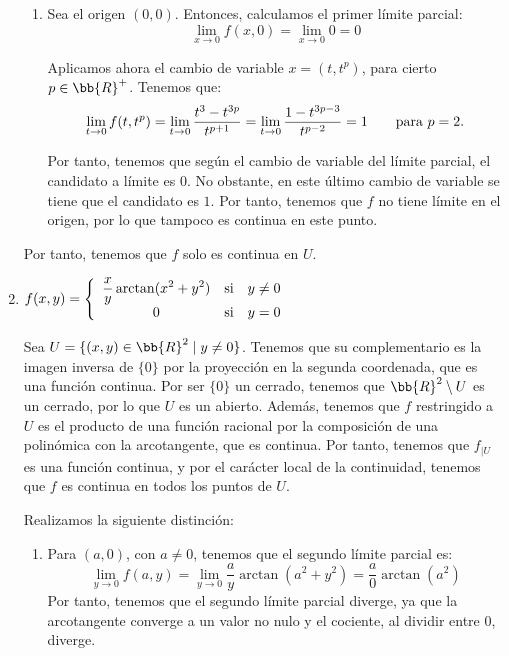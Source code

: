 \begin{ejercicio}
\begin{enumerate}
\begin{enumerate}
            \item Sea el origen $(0,0)$. Entonces, calculamos el primer límite parcial:
            \begin{equation*}
                \lim_{x\to 0}f(x,0)
                = \lim_{x\to 0} 0 = 0
            \end{equation*}

            Aplicamos ahora el cambio de variable $x=(t,t^p)$, para cierto $p\in \bb{R}^+$. Tenemos que:
            \begin{equation*}
                \lim_{t\to 0}f(t,t^p)
                = \lim_{t\to 0} \frac{t^3-t^{3p}}{t^{p+1}}
                = \lim_{t\to 0} \frac{1-t^{3p-3}}{t^{p-2}}
                = 1 \text{\qquad para $p=2$}.
            \end{equation*}
            
            Por tanto, tenemos que según el cambio de variable del límite parcial, el candidato a límite es $0$. No obstante, en este último cambio de variable se tiene que el candidato es $1$. Por tanto, tenemos que $f$ no tiene límite en el origen, por lo que tampoco es continua en este punto.
        \end{enumerate}

        Por tanto, tenemos que $f$ solo es continua en $U$.

        \item $\displaystyle
            f(x,y)=
            \left\{\begin{array}{ccc}
                \displaystyle \frac{x}{y}\arctan(x^2+y^2) &\text{si}& y\neq 0\\
                0 &\text{si}& y=0
            \end{array}\right. \displaystyle$

        Sea $U=\{(x,y)\in \bb{R}^2\mid y\neq 0\}$. Tenemos que su complementario es la imagen inversa de $\{0\}$ por la proyección en la segunda coordenada, que es una función continua. Por ser $\{0\}$ un cerrado, tenemos que $\bb{R}^2\setminus U$ es un cerrado, por lo que $U$ es un abierto. Además, tenemos que $f$ restringido a $U$ es el producto de una función racional por la composición de una polinómica con la arcotangente, que es continua. Por tanto, tenemos que $f_{\big| U}$ es una función continua, y por el carácter local de la continuidad, tenemos que $f$ es continua en todos los puntos de $U$.

        Realizamos la siguiente distinción:
        \begin{enumerate}
            \item Para $(a,0)$, con $a\neq 0$, tenemos que el segundo límite parcial es:
            \begin{equation*}
                \lim_{y\to 0}f(a,y)
                = \lim_{y\to 0}\frac{a}{y}\arctan(a^2+y^2)
                = \frac{a}{0}\arctan(a^2)
            \end{equation*}
            Por tanto, tenemos que el segundo límite parcial diverge, ya que la arcotangente converge a un valor no nulo y el cociente, al dividir entre 0, diverge.


\end{enumerate}
\end{enumerate}
\end{ejercicio}
